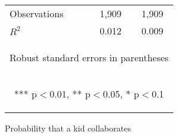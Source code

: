 \documentclass{article} %
\begin{document}
\begin{table}[H]
\begin{center}
\begin{tabular}{lcc}
Observations & 1,909 & 1,909 \\
 $R^2$ & 0.012 & 0.009 \\ \hline
\multicolumn{3}{c}{\begin{footnotesize} Robust standard errors in parentheses\end{footnotesize}} \\
\multicolumn{3}{c}{\begin{footnotesize} *** p$<$0.01, ** p$<$0.05, * p$<$0.1\end{footnotesize}} \\
\end{tabular}
\end{center}


\end{table}

\begin{table}[H]
\caption{Probability that a kid collaborates} \label{tab:behav_results}



\end{table}
\end{document}
